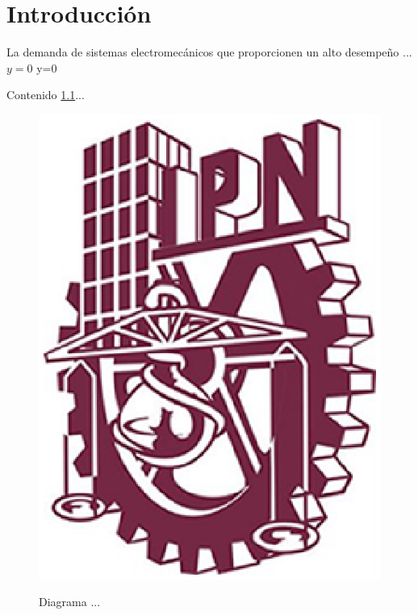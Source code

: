 \chapter{Introducción \label{cap1}}

La demanda de sistemas electromecánicos que proporcionen un alto
desempeño ...
$y=0$ y=0

Contenido \ref{FigLogo}...
\begin{figure}[h]
    \centering
  \includegraphics[scale=0.5]{CapituloI/Imagenes/logo_ipn.eps}\\
  \caption{Diagrama ...}\label{FigLogo}
\end{figure}

